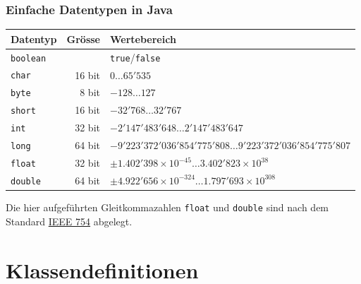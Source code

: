 \begin{frame}[fragile]
    \begin{table}[h]
        \frametitle<presentation>{Einfache Datentypen in Java}
        \centering
        \begin{tabular}{|l|r|l|}
            \hline
            \textbf{Datentyp}          & \textbf{Grösse} & \textbf{Wertebereich}                             \\ \hline
            \texttt{boolean} & & \texttt{true}/\texttt{false}  \\ \hline
            \texttt{char}    & 16 bit & $0 \ldots 65'535$                                 \\ \hline
            \texttt{byte}    & 8 bit & $-128 \ldots 127$                                 \\ \hline
            \texttt{short}   & 16 bit & $-32'768 \ldots 32'767$                           \\ \hline
            \texttt{int}     & 32 bit & $-2'147'483'648 \ldots 2'147'483'647$             \\ \hline
            \texttt{long}    & 64 bit & $-9'223'372'036'854'775'808 \ldots 9'223'372'036'854'775'807$  \\ \hline
            \texttt{float}   & 32 bit & $\pm 1.402'398 \times 10^{-45}  \ldots 3.402'823 \times 10^{38}$  \\ \hline
            \texttt{double}  & 64 bit & $\pm 4.922'656 \times 10^{-324} \ldots 1.797'693 \times 10^{308}$ \\ \hline
        \end{tabular}
    \end{table}
\end{frame}

Die hier aufgeführten Gleitkommazahlen \texttt{float} und \texttt{double} sind
nach dem Standard \href{https://de.wikipedia.org/wiki/IEEE_754}{IEEE 754} abgelegt.



\section{Klassendefinitionen}
\label{sec:class-definitions}

